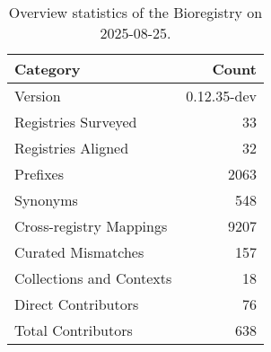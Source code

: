 \begin{table}
\caption{Overview statistics of the Bioregistry on 2025-08-25.}
\label{tab:bioregistry-summary}
\begin{tabular}{lr}
\toprule
Category & Count \\
\midrule
Version & 0.12.35-dev \\
Registries Surveyed & 33 \\
Registries Aligned & 32 \\
Prefixes & 2063 \\
Synonyms & 548 \\
Cross-registry Mappings & 9207 \\
Curated Mismatches & 157 \\
Collections and Contexts & 18 \\
Direct Contributors & 76 \\
Total Contributors & 638 \\
\bottomrule
\end{tabular}
\end{table}
